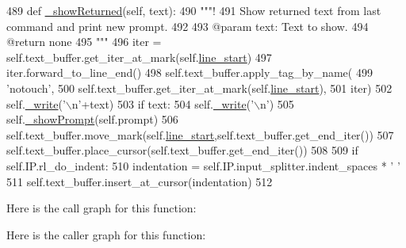 \begin{DoxyCode}
489   \textcolor{keyword}{def }\hyperlink{classvisualizer_1_1ipython__view_1_1ConsoleView_a5fd73a63b28d972cb73270c6101d4eb0}{\_showReturned}(self, text):
490     \textcolor{stringliteral}{"""!}
491 \textcolor{stringliteral}{    Show returned text from last command and print new prompt.}
492 \textcolor{stringliteral}{    }
493 \textcolor{stringliteral}{    @param text: Text to show.}
494 \textcolor{stringliteral}{    @return none}
495 \textcolor{stringliteral}{    """}
496     iter = self.text\_buffer.get\_iter\_at\_mark(self.\hyperlink{classvisualizer_1_1ipython__view_1_1ConsoleView_a9593fe742cea9fb6fb0a2f15400a9a11}{line\_start})
497     iter.forward\_to\_line\_end()
498     self.text\_buffer.apply\_tag\_by\_name(
499       \textcolor{stringliteral}{'notouch'}, 
500       self.text\_buffer.get\_iter\_at\_mark(self.\hyperlink{classvisualizer_1_1ipython__view_1_1ConsoleView_a9593fe742cea9fb6fb0a2f15400a9a11}{line\_start}),
501       iter)
502     self.\hyperlink{classvisualizer_1_1ipython__view_1_1ConsoleView_a9759d9e625a21718dcd1dfe1188cc1d2}{\_write}(\textcolor{stringliteral}{'\(\backslash\)n'}+text)
503     \textcolor{keywordflow}{if} text:
504       self.\hyperlink{classvisualizer_1_1ipython__view_1_1ConsoleView_a9759d9e625a21718dcd1dfe1188cc1d2}{\_write}(\textcolor{stringliteral}{'\(\backslash\)n'})
505     self.\hyperlink{classvisualizer_1_1ipython__view_1_1ConsoleView_a539d2a93fbf7a7c8ca1e6fa9fe2aa875}{\_showPrompt}(self.prompt)
506     self.text\_buffer.move\_mark(self.\hyperlink{classvisualizer_1_1ipython__view_1_1ConsoleView_a9593fe742cea9fb6fb0a2f15400a9a11}{line\_start},self.text\_buffer.get\_end\_iter())
507     self.text\_buffer.place\_cursor(self.text\_buffer.get\_end\_iter())
508 
509     \textcolor{keywordflow}{if} self.IP.rl\_do\_indent:
510       indentation = self.IP.input\_splitter.indent\_spaces * \textcolor{stringliteral}{' '}
511       self.text\_buffer.insert\_at\_cursor(indentation)
512 
\end{DoxyCode}


Here is the call graph for this function\+:




Here is the caller graph for this function\+:


